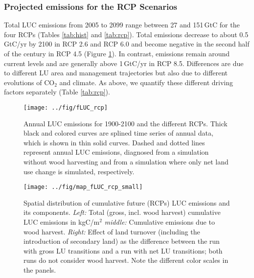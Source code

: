 \subsubsection*{Projected emissions for the RCP Scenarios}
Total LUC emissions from 2005 to 2099 range between 27 and 151\,GtC for the four RCPs (Tables \ref{tab:hist} and \ref{tab:rcp}). Total emissions decrease to about 0.5\,GtC/yr by 2100 in RCP 2.6 and RCP 6.0 and become negative in the second half of the century in RCP 4.5 (Figure \ref{fig:fluc.rcp}). In contrast, emissions remain around current levels and are generally above 1\,GtC/yr in RCP 8.5.  Differences are due to different LU area and management trajectories but also due to different evolutions of CO$_2$ and climate. As above, we quantify these different driving factors separately (Table \ref{tab:rcp}).
\begin{figure}
\begin{center}
 \noindent
 \texttt{[image: ../fig/fLUC\_rcp]}
 \caption[Annual LUC emissions for 1900-2100 and the different RCPs]{Annual LUC emissions for 1900-2100 and the different RCPs. Thick black and colored curves are splined time series of annual data, which is shown in thin solid curves. Dashed and dotted lines represent annual LUC emissions, diagnosed from a simulation without wood harvesting and from a simulation where only net land use change is simulated, respectively.}
 \label{fig:fluc.rcp}
\end{center}
\end{figure}

\begin{figure}
 \noindent
 \texttt{[image: ../fig/map\_fLUC\_rcp\_small]}
 \caption[Spatial distribution of cumulative future (RCPs) LUC emissions and its components]{Spatial distribution of cumulative future (RCPs) LUC emissions and its components. {\it Left:} Total (gross, incl. wood harvest) cumulative LUC emissions in kgC/m$^2$ {\it middle:} Cumulative emissions due to wood harvest. {\it Right:} Effect of land turnover (including the introduction of secondary land) as the difference between the run with gross LU transitions and a run with net LU transitions; both runs do not consider wood harvest. Note the different color scales in the panels.}
 \label{fig:fluc.rcp.map}
\end{figure}

